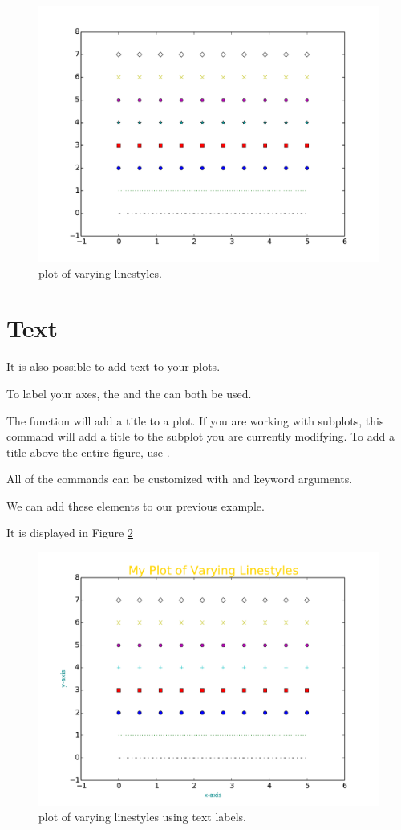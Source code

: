 \begin{figure} 
\includegraphics[width=\textwidth]{linestyle.pdf}
\caption{plot of varying linestyles.}
\label{linestyle} 
\end{figure}


\section*{Text}
It is also possible to add text to your plots. 

To label your axes, the  and the  can both be used. 

The function  will add a title to a plot.
If you are working with subplots, this command will add a title to the subplot you are currently modifying.
To add a title above the entire figure, use .


All of the  commands can be customized with  and  keyword arguments. 

We can add these elements to our previous example. 

It is displayed in Figure \ref{text}


\begin{figure} 
\includegraphics[width=\textwidth]{text.pdf}
\caption{plot of varying linestyles using text labels.}
\label{text} 
\end{figure}
